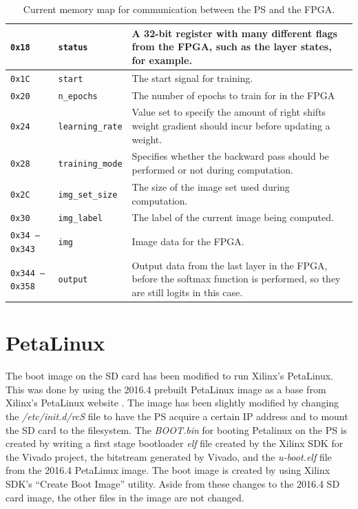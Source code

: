 \begin{table}
\begin{tabularx}{\textwidth}{|l| l| X|}
		\texttt{0x18} &
		\texttt{status} &
		A 32-bit register with many different flags from the FPGA, such as the layer states, for example. \\\hline 
		
		\texttt{0x1C} &
		\texttt{start} &
		The start signal for training. \\\hline 
		
		\texttt{0x20} &
		\texttt{n\_epochs} &
		The number of epochs to train for in the FPGA \\\hline 
		
		\texttt{0x24} &
		\texttt{learning\_rate} &
		Value set to specify the amount of right shifts weight gradient should incur before updating a weight. \\\hline 
		
		\texttt{0x28} &
		\texttt{training\_mode} &
		Specifies whether the backward pass should be performed or not during computation.\\\hline
		
		\texttt{0x2C} &
		\texttt{img\_set\_size} &
		The size of the image set used during computation. \\\hline 
		
		\texttt{0x30} &
		\texttt{img\_label} &
		The label of the current image being computed. \\\hline 
		
		\texttt{0x34 -- 0x343} &
		\texttt{img} &
		Image data for the FPGA. \\\hline
		
		\texttt{0x344 -- 0x358} &
		\texttt{output} &
		Output data from the last layer in the FPGA, before the softmax function is performed, so they are still logits in this case.\\\hline		
	\end{tabularx}	
	\caption{Current memory map for communication between the PS and the FPGA.}
	\label{tbl:mmio}
\end{table}

\section{PetaLinux}
The boot image on the SD card has been modified to run Xilinx's PetaLinux. This was done by using the 2016.4 prebuilt PetaLinux image as a base from Xilinx's PetaLinux website \cite{petalinux}. The image has been slightly modified by changing the \textit{/etc/init.d/rcS} file to have the PS acquire a certain IP address and to mount the SD card to the filesystem. The \textit{BOOT.bin} for booting Petalinux on the PS is created by writing a first stage bootloader \textit{elf} file created by the Xilinx SDK for the Vivado project, the bitstream generated by Vivado, and the \textit{u-boot.elf} file from the 2016.4 PetaLinux image. The boot image is created by using Xilinx SDK's ``Create Boot Image'' utility. Aside from these changes to the 2016.4 SD card image, the other files in the image are not changed.

